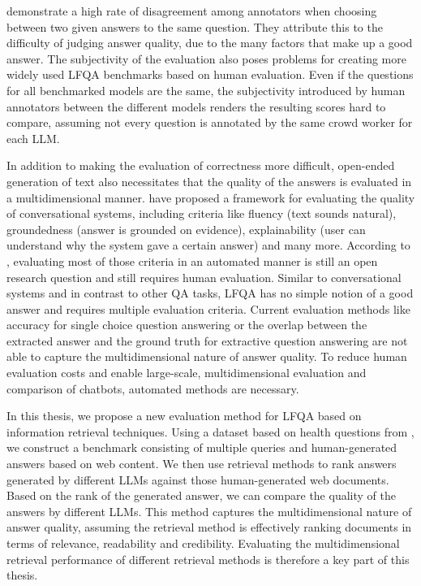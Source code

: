 \cite{krishna:2021:Hurdles} demonstrate a high rate of disagreement among annotators when choosing between two given answers to the same question.
They attribute this to the difficulty of judging answer quality, due to the many factors that make up a good answer.
The subjectivity of the evaluation also poses problems for creating more widely used LFQA benchmarks based on human evaluation.
Even if the questions for all benchmarked models are the same, the subjectivity introduced by human annotators between the different models renders the resulting scores hard to compare, assuming not every question is annotated by the same crowd worker for each LLM.

In addition to making the evaluation of correctness more difficult, open-ended generation of text also necessitates that the quality of the answers is evaluated in a multidimensional manner.
\cite{sakai:2023:swan} have proposed a framework for evaluating the quality of conversational systems, including criteria like fluency (text sounds natural), groundedness (answer is grounded on evidence), explainability (user can understand why the system gave a certain answer) and many more.
According to \cite{sakai:2023:swan}, evaluating most of those criteria in an automated manner is still an open research question and still requires human evaluation. 
Similar to conversational systems and in contrast to other QA tasks, LFQA has no simple notion of a good answer and requires multiple evaluation criteria.
Current evaluation methods like accuracy for single choice question answering or the overlap between the extracted answer and the ground truth for extractive question answering are not able to capture the multidimensional nature of answer quality.
To reduce human evaluation costs and enable large-scale, multidimensional evaluation and comparison of chatbots, automated methods are necessary.

In this thesis, we propose a new evaluation method for LFQA based on information retrieval techniques.
Using a dataset based on health questions from \cite{goeuriot:2021:Consumer}, we construct a benchmark consisting of multiple queries and human-generated answers based on web content.
We then use retrieval methods to rank answers generated by different LLMs against those human-generated web documents.
Based on the rank of the generated answer, we can compare the quality of the answers by different LLMs.
This method captures the multidimensional nature of answer quality, assuming the retrieval method is effectively ranking documents in terms of relevance, readability and credibility.
Evaluating the multidimensional retrieval performance of different retrieval methods is therefore a key part of this thesis.

